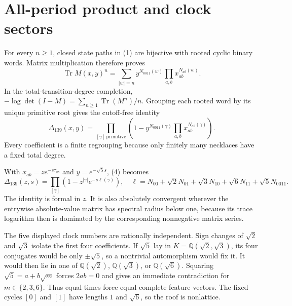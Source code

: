 \documentclass[10pt]{article}
\begin{document}
\section{All-period product and clock sectors}
For every $n\geq1$, closed state paths in (1) are bijective with rooted cyclic
binary words.  Matrix multiplication therefore proves
\begin{equation}
\operatorname{Tr}M(x,y)^n
=\sum_{|w|=n}y^{N_{0011}(w)}\prod_{a,b}x_{ab}^{N_{ab}(w)}. \tag{3}
\end{equation}
In the total-transition-degree completion,
$-\log\det(I-M)=\sum_{n\geq1}\operatorname{Tr}(M^n)/n$.  Grouping each
rooted word by its unique primitive root gives the cutoff-free identity
\begin{equation}
\Delta_{139}(x,y)=\prod_{[\gamma]\ \mathrm{primitive}}
\left(1-y^{N_{0011}(\gamma)}\prod_{a,b}x_{ab}^{N_{ab}(\gamma)}\right).
\tag{4}
\end{equation}
Every coefficient is a finite regrouping because only finitely many necklaces
have a fixed total degree.

With $x_{ab}=z e^{-s\tau_{ab}}$ and $y=e^{-\sqrt5s}$, (4) becomes
\[
\Delta_{139}(z,s)=\prod_{[\gamma]}
\left(1-z^{|\gamma|}e^{-s\ell(\gamma)}\right),
\quad
\ell=N_{00}+\sqrt2N_{01}+\sqrt3N_{10}+\sqrt6N_{11}+\sqrt5N_{0011}.
\]
The identity is formal in $z$.  It is also absolutely convergent wherever the
entrywise absolute-value matrix has spectral radius below one, because its
trace logarithm then is dominated by the corresponding nonnegative matrix
series.

The five displayed clock numbers are rationally independent.  Sign changes of
$\sqrt2$ and $\sqrt3$ isolate the first four coefficients.  If $\sqrt5$ lay
in $K=\mathbb Q(\sqrt2,\sqrt3)$, its four conjugates would be only
$\pm\sqrt5$, so a nontrivial automorphism would fix it.  It would then lie in
one of $\mathbb Q(\sqrt2)$, $\mathbb Q(\sqrt3)$, or $\mathbb Q(\sqrt6)$.
Squaring $\sqrt5=a+b\sqrt m$ forces $2ab=0$ and gives an immediate
contradiction for $m\in\{2,3,6\}$.  Thus equal times force equal complete
feature vectors.  The fixed cycles $[0]$ and $[1]$ have lengths $1$ and
$\sqrt6$, so the roof is nonlattice.
\end{document}
